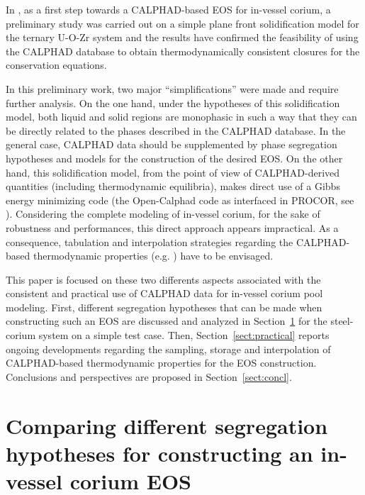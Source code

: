\documentclass[11pt]{article}\usepackage{geometry} \geometry{letterpaper, margin=25.4mm}
\newcommand{\Sect}[1]{Section~\ref{sect:#1}}
\begin{document}
In \cite{Tiwari2018}, as a first step towards a CALPHAD-based EOS for in-vessel corium, a preliminary study was carried out on a simple plane front solidification model for the ternary U-O-Zr system and the results have confirmed the feasibility of using the CALPHAD database to obtain thermodynamically consistent closures for the conservation equations. 

In this preliminary work, two major ``simplifications'' were made and require further analysis. On the one hand, under the hypotheses of this solidification model, both liquid and solid regions are monophasic in such a way that they can be directly related to the phases described in the CALPHAD database. In the general case, CALPHAD data should be supplemented by phase segregation hypotheses and models for the construction of the desired EOS. %
On the other hand, this solidification model, from the point of view of CALPHAD-derived quantities (including thermodynamic equilibria), makes direct use of a Gibbs energy minimizing code (the Open-Calphad code as interfaced in PROCOR, see \cite{Sundman2016}). Considering the complete modeling of in-vessel corium, for the sake of robustness and performances, this direct approach appears impractical. As a consequence, tabulation and interpolation strategies regarding the CALPHAD-based thermodynamic properties (e.g. \cite{Saad2015}) have to be envisaged.

This paper is focused on these two differents aspects associated with the consistent and practical use of CALPHAD data for in-vessel corium pool modeling.
First, different segregation hypotheses that can be made when constructing such an EOS are discussed and analyzed in \Sect{analytical} for the steel-corium system on a simple test case. Then, \Sect{practical} reports ongoing developments regarding the sampling, storage and interpolation of CALPHAD-based thermodynamic properties for the EOS construction. Conclusions and perspectives are proposed in \Sect{concl}.

\section{Comparing different segregation hypotheses for constructing an in-vessel corium EOS} \label{sect:analytical}
\end{document}
